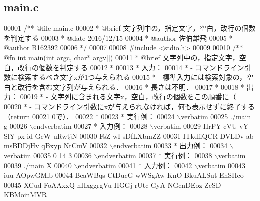 \subsection{main.\-c}

\begin{DoxyCode}
00001 \textcolor{comment}{/**  @file main.c}
00002 \textcolor{comment}{ *   @brief  文字列中の，指定文字，空白，改行の個数を判定する}
00003 \textcolor{comment}{ *   @date   2016/12/15}
00004 \textcolor{comment}{ *   @author 佐伯雄飛}
00005 \textcolor{comment}{ *   @author B162392}
00006 \textcolor{comment}{ */}
00007 
00008 \textcolor{preprocessor}{#include <stdio.h>}
00009 \textcolor{comment}{}
00010 \textcolor{comment}{/** @fn int main(int argc, char* argv[])}
00011 \textcolor{comment}{ *  @brief 文字列中の，指定文字，空白，改行の個数を判定する}
00012 \textcolor{comment}{ *}
00013 \textcolor{comment}{ *  入力：}
00014 \textcolor{comment}{ *  - コマンドライン引数に検索するべき文字xが1つ与えられる}
00015 \textcolor{comment}{ *  - 標準入力には検索対象の，空白と改行を含む文字列が与えられる．}
00016 \textcolor{comment}{ *    長さは不明．}
00017 \textcolor{comment}{ *}
00018 \textcolor{comment}{ *  出力：}
00019 \textcolor{comment}{ *  - 文字列に含まれる文字x，空白，改行の個数をこの順番に（%
00020 \textcolor{comment}{ *  - コマンドライン引数にxが与えられなければ，何も表示せずに終了する（return}
00021 \textcolor{comment}{0で）．}
00022 \textcolor{comment}{ *}
00023 \textcolor{comment}{ *  実行例：}
00024 \textcolor{comment}{\(\backslash\)verbatim}
00025 \textcolor{comment}{./main g}
00026 \textcolor{comment}{\(\backslash\)endverbatim}
00027 \textcolor{comment}{ *  入力例：}
00028 \textcolor{comment}{\(\backslash\)verbatim}
00029 \textcolor{comment}{HrPY cVU vY SlY px id GcW uRwtjN}
00030 \textcolor{comment}{FsZ wI sDfLXbmZZ}
00031 \textcolor{comment}{ITkdflQCR DVLDv ab msBDDjHv qBxyp NtCmV}
00032 \textcolor{comment}{\(\backslash\)endverbatim}
00033 \textcolor{comment}{  *  出力例：}
00034 \textcolor{comment}{\(\backslash\)verbatim}
00035 \textcolor{comment}{0 14 3}
00036 \textcolor{comment}{\(\backslash\)endverbatim}
00037 \textcolor{comment}{ *  実行例：}
00038 \textcolor{comment}{\(\backslash\)verbatim}
00039 \textcolor{comment}{./main X}
00040 \textcolor{comment}{\(\backslash\)endverbatim}
00041 \textcolor{comment}{  *  入力例：}
00042 \textcolor{comment}{\(\backslash\)verbatim}
00043 \textcolor{comment}{iuu AOpwGMlb}
00044 \textcolor{comment}{BeaWBqs CtDucG wWSgAw KnO BkuALSut EhSHco}
00045 \textcolor{comment}{XCud FoAAxxQ hHxggrgVu HGGj rUtc GyA NGcnDEoz ZcSD KBMoinMVR}
}
\end{DoxyCode}
